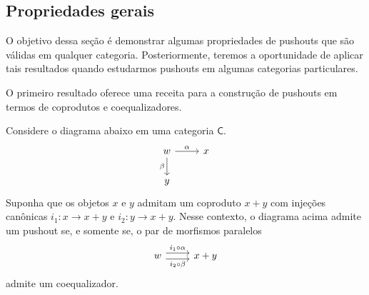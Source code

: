 \subsection{Propriedades gerais}

O objetivo dessa seção é demonstrar algumas propriedades de pushouts que são válidas em qualquer categoria.
Posteriormente, teremos a oportunidade de aplicar tais resultados quando estudarmos pushouts em algumas categorias particulares.

O primeiro resultado oferece uma receita para a construção de pushouts em termos de  coprodutos e coequalizadores.

\begin{teo}
   Considere o diagrama abaixo em uma categoria $\mathsf{C}$.
   \begin{displaymath}
    \begin{tikzcd}
        w
        \arrow[r, "\alpha"]
        \arrow[d, "\beta" swap]
        & x
        \\ y
    \end{tikzcd}
   \end{displaymath}
   Suponha que os objetos $x$ e $y$ admitam um coproduto $x+y$ com injeções canônicas $i_1: x \to x + y$ e $i_2: y \to x+y$.
   Nesse contexto, o diagrama acima admite um pushout se, e somente se, o par de morfismos paralelos
   \begin{displaymath}
    \begin{tikzcd}
        w
        \arrow[r, shift left=1.25, "i_1 \circ \alpha"]
        \arrow[r, shift right=1.25, "i_2 \circ \beta" swap]
        & x+y
    \end{tikzcd}
   \end{displaymath}
   admite um coequalizador.
\end{teo}

